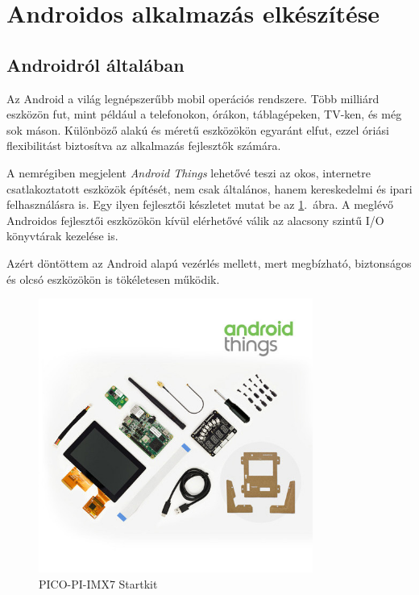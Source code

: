 \documentclass[../main.tex]{subfiles}
\begin{document}
\section{Androidos alkalmazás elkészítése}
    \subsection{Androidról általában}
        Az Android a világ legnépszerűbb mobil operációs rendszere. Több milliárd eszközön fut, mint például a telefonokon, órákon, táblagépeken, TV-ken, és még sok máson. 
        Különböző alakú és méretű eszközökön egyaránt elfut, ezzel óriási flexibilitást biztosítva az alkalmazás fejlesztők számára. \cite{android_about} 
        
        A nemrégiben megjelent \textit{Android Things} lehetővé teszi az okos, internetre csatlakoztatott eszközök építését, nem csak általános, hanem kereskedelmi és ipari felhasználásra is. Egy ilyen fejlesztői készletet mutat be az \ref{fig:android_things}.~ábra. A meglévő Androidos fejlesztői eszközökön kívül elérhetővé válik az alacsony szintű I/O könyvtárak kezelése is. 
        
        Azért döntöttem az Android alapú vezérlés mellett, mert megbízható, biztonságos és olcsó eszközökön is tökéletesen működik. 
        
        \begin{figure}[h!] %
            \centering
            \includegraphics[height=9cm]{android_res/pico-pi-imx7-startkit.jpg}
            \caption{PICO-PI-IMX7 Startkit\cite{android_starter_kit}}
            \label{fig:android_things}
        \end{figure}
    
\end{document}
